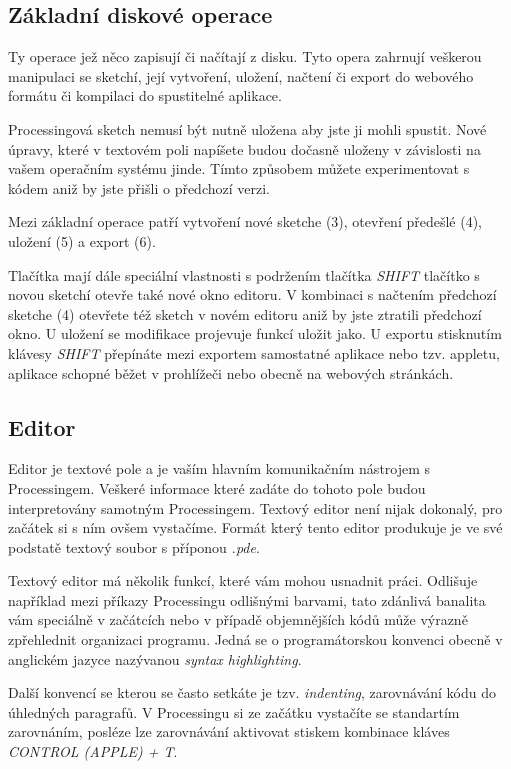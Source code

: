 \documentclass[11pt]{article}
\begin{document}
\newpage
\subsection{Základní diskové operace}

Ty operace jež něco zapisují či načítají z disku. Tyto opera zahrnují veškerou manipulaci se sketchí, její vytvoření, uložení, načtení či export do webového formátu či kompilaci do spustitelné aplikace.

Processingová sketch nemusí být nutně uložena aby jste ji mohli spustit. Nové úpravy, které v textovém poli napíšete budou dočasně uloženy v závislosti na vašem operačním systému jinde. Tímto způsobem můžete experimentovat s kódem aniž by jste přišli o předchozí verzi.

Mezi základní operace patří vytvoření nové sketche (3), otevření předešlé (4), uložení (5) a export (6).

Tlačítka mají dále speciální vlastnosti s podržením tlačítka {\em SHIFT} tlačítko s novou sketchí otevře také nové okno editoru. V kombinaci s načtením předchozí sketche (4) otevřete též sketch v novém editoru aniž by jste ztratili předchozí okno. U uložení se modifikace projevuje funkcí uložit jako. U exportu stisknutím klávesy {\em SHIFT} přepínáte mezi exportem samostatné aplikace nebo tzv. appletu, aplikace schopné běžet v prohlížeči nebo obecně na webových stránkách.

\subsection{Editor}

Editor je textové pole a je vaším hlavním komunikačním nástrojem s Processingem. Veškeré informace které zadáte do tohoto pole budou interpretovány samotným Processingem. Textový editor není nijak dokonalý, pro začátek si s ním ovšem vystačíme. Formát který tento editor produkuje je ve své podstatě textový soubor s příponou {\em *.pde}.

Textový editor má několik funkcí, které vám mohou usnadnit práci. Odlišuje například mezi příkazy Processingu odlišnými barvami, tato zdánlivá banalita vám speciálně v začátcích nebo v případě objemnějších kódů může výrazně zpřehlednit organizaci programu. Jedná se o programátorskou konvenci obecně v anglickém jazyce nazývanou {\em syntax highlighting}.

Další konvencí se kterou se často setkáte je tzv. {\em indenting}, zarovnávání kódu do úhledných paragrafů. V Processingu si ze začátku vystačíte se standartím zarovnáním, posléze lze zarovnávání aktivovat stiskem kombinace kláves {\em CONTROL (APPLE) + T}.\\
\end{document}
